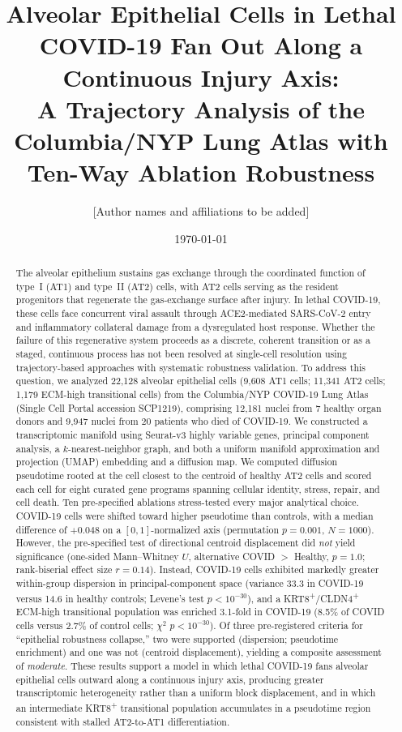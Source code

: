 \documentclass[11pt]{article}
\title{Alveolar Epithelial Cells in Lethal COVID-19 Fan Out Along a Continuous Injury Axis:\\
A Trajectory Analysis of the Columbia/NYP Lung Atlas with Ten-Way Ablation Robustness}
\author{[Author names and affiliations to be added]}
\date{\today}
\begin{document}
\maketitle

\begin{abstract}
\noindent The alveolar epithelium sustains gas exchange through the coordinated function of type~I (AT1) and type~II (AT2) cells, with AT2 cells serving as the resident progenitors that regenerate the gas-exchange surface after injury. In lethal COVID-19, these cells face concurrent viral assault through ACE2-mediated SARS-CoV-2 entry and inflammatory collateral damage from a dysregulated host response. Whether the failure of this regenerative system proceeds as a discrete, coherent transition or as a staged, continuous process has not been resolved at single-cell resolution using trajectory-based approaches with systematic robustness validation. To address this question, we analyzed 22{,}128 alveolar epithelial cells (9{,}608 AT1 cells; 11{,}341 AT2 cells; 1{,}179 ECM-high transitional cells) from the Columbia/NYP COVID-19 Lung Atlas (Single Cell Portal accession SCP1219), comprising 12{,}181 nuclei from 7 healthy organ donors and 9{,}947 nuclei from 20 patients who died of COVID-19. We constructed a transcriptomic manifold using Seurat-v3 highly variable genes, principal component analysis, a $k$-nearest-neighbor graph, and both a uniform manifold approximation and projection (UMAP) embedding and a diffusion map. We computed diffusion pseudotime rooted at the cell closest to the centroid of healthy AT2 cells and scored each cell for eight curated gene programs spanning cellular identity, stress, repair, and cell death. Ten pre-specified ablations stress-tested every major analytical choice. COVID-19 cells were shifted toward higher pseudotime than controls, with a median difference of $+0.048$ on a $[0,1]$-normalized axis (permutation $p = 0.001$, $N = 1000$). However, the pre-specified test of directional centroid displacement did \emph{not} yield significance (one-sided Mann--Whitney $U$, alternative COVID $>$ Healthy, $p = 1.0$; rank-biserial effect size $r = 0.14$). Instead, COVID-19 cells exhibited markedly greater within-group dispersion in principal-component space (variance 33.3 in COVID-19 versus 14.6 in healthy controls; Levene's test $p < 10^{-30}$), and a KRT8\textsuperscript{+}/CLDN4\textsuperscript{+} ECM-high transitional population was enriched 3.1-fold in COVID-19 (8.5\% of COVID cells versus 2.7\% of control cells; $\chi^2$ $p < 10^{-30}$). Of three pre-registered criteria for ``epithelial robustness collapse,'' two were supported (dispersion; pseudotime enrichment) and one was not (centroid displacement), yielding a composite assessment of \emph{moderate}. These results support a model in which lethal COVID-19 fans alveolar epithelial cells outward along a continuous injury axis, producing greater transcriptomic heterogeneity rather than a uniform block displacement, and in which an intermediate KRT8\textsuperscript{+} transitional population accumulates in a pseudotime region consistent with stalled AT2-to-AT1 differentiation.
\end{abstract}
\end{document}
